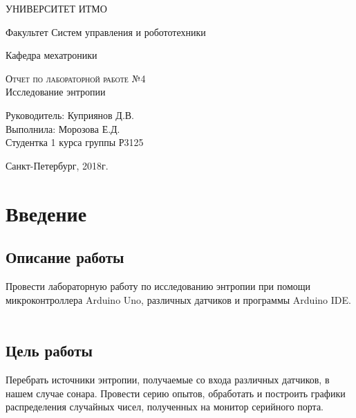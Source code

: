 \documentclass[12pt,a4paper]{scrartcl}
\begin{document}
\begin{titlepage}
  \begin{center}
    \large
 
    УНИВЕРСИТЕТ ИТМО
    \vspace{0.25cm}
     
    Факультет Систем управления и робототехники
     
    Кафедра мехатроники
    \vfill
 
    \textsc{Отчет по лабораторной работе №4}\\[5mm]
     
    {\LARGE Исследование энтропии}

\end{center}
\vfill
 
\newlength{\ML}
\hfill\begin{minipage}{0.4\textwidth}
  Руководитель: Куприянов Д.В.\\
  Выполнила: Морозова Е.Д. \\
  Студентка 1 курса группы Р3125\\
  
  
\end{minipage}%
\bigskip

 
\begin{center}
  Санкт-Петербург, 2018г.
\end{center}
\end{titlepage}

\begin{tableofcontents}
\end{tableofcontents}
    \newpage
    
\section{Введение}

\label{sec:intro}
 
\subsection{Описание работы}
Провести лабораторную работу по исследованию энтропии при помощи микроконтроллера Arduino Uno, различных датчиков и программы Arduino IDE.\\
\\

\subsection{Цель работы}
Перебрать источники энтропии, получаемые со входа различных датчиков, в нашем случае сонара. Провести серию опытов, обработать и построить графики распределения случайных чисел, полученных на монитор серийного порта. 
\end{document}
